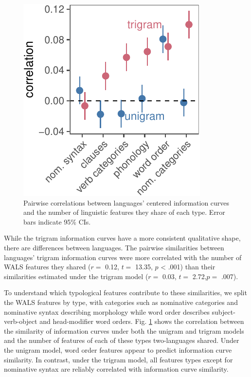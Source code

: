 \documentclass[10pt, letterpaper]{article}
\newenvironment{CodeChunk}{}{}
\begin{document}
\begin{CodeChunk}
\begin{figure}[tb]

{\centering \includegraphics{figs/type_cors-1} 

}

\caption[Pairwise correlations between languages' centered information curves and the number of linguistic features they share of each type]{Pairwise correlations between languages' centered information curves and the number of linguistic features they share of each type. Error bars indicate 95\% CIs.}\label{fig:type_cors}
\end{figure}
\end{CodeChunk}

While the trigram information curves have a more consistent qualitative
shape, there are differences between languages. The pairwise
similarities between languages' trigram information curves were more
correlated with the number of WALS features they shared (\(r =\) 0.12,
\(t =\) 13.35, \(p\) \textless{} .001) than their similarities estimated
under the trigram model (\(r =\) 0.03, \(t =\) 2.72,\(p =\) .007).

To understand which typological features contribute to these
similarities, we split the WALS features by type, with categories such
as nominative categories and nominative syntax describing morphology
while word order describes subject-verb-object and head-modifier word
orders. Fig. \ref{fig:type_cors} shows the correlation between the
similarity of information curves under both the unigram and trigram
models and the number of features of each of these types two-languages
shared. Under the unigram model, word order features appear to predict
information curve similarity. In contrast, under the trigram model, all
features types except for nominative syntax are reliably correlated with
information curve similarity.
\end{document}
